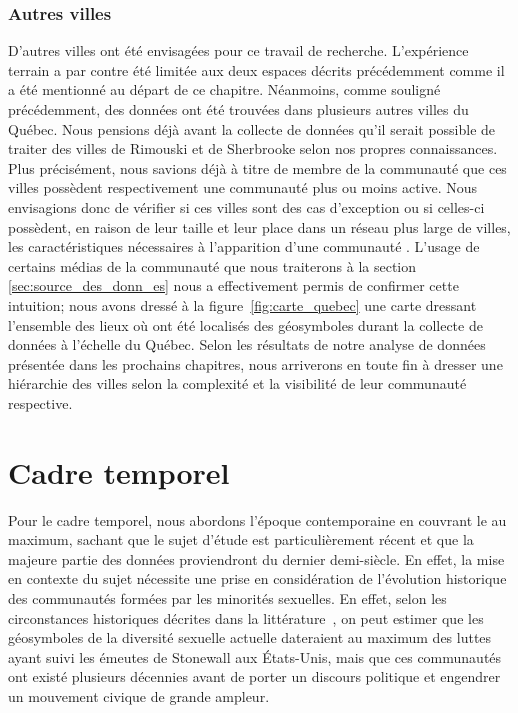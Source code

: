 \subsubsection{Autres villes}
\label{ssub:autres_villes}
D'autres villes ont été envisagées pour ce travail de recherche. 
L'expérience terrain a par contre été limitée aux deux espaces décrits précédemment comme il a été mentionné au départ de ce chapitre. 
Néanmoins, comme souligné précédemment, des données ont été trouvées dans plusieurs autres villes du Québec. 
Nous pensions déjà avant la collecte de données qu'il serait possible de traiter des villes de Rimouski et de Sherbrooke selon nos propres connaissances. 
Plus précisément, nous savions déjà à titre de membre de la communauté \lgbt{} que ces villes possèdent respectivement une communauté plus ou moins active. 
Nous envisagions donc de vérifier si ces villes sont des cas d'exception ou si celles-ci possèdent, en raison de leur taille et leur place dans un réseau plus large de villes, les caractéristiques nécessaires à l'apparition d'une communauté \lgbt.
L'usage de certains médias de la communauté que nous traiterons à la section \ref{sec:source_des_donn_es} nous a effectivement permis de confirmer cette intuition; nous avons dressé à la figure~\ref{fig:carte_quebec} une carte dressant l'ensemble des lieux où ont été localisés des géosymboles durant la collecte de données à l'échelle du Québec. 
Selon les résultats de notre analyse de données présentée dans les prochains chapitres, nous arriverons en toute fin à dresser une hiérarchie des villes selon la complexité et la visibilité de leur communauté respective.

\section{Cadre temporel}
\label{sec:cadre_temporel}
Pour le cadre temporel, nous abordons l'époque contemporaine en couvrant le  au maximum, sachant que le sujet d'étude est particulièrement récent et que la majeure partie des données proviendront du dernier demi-siècle. 
En effet, la mise en contexte du sujet nécessite une prise en considération de l'évolution historique des communautés formées par les minorités sexuelles. 
En effet, selon les circonstances historiques décrites dans la littérature~\citep{Spencer2005}, on peut estimer que les géosymboles de la diversité sexuelle actuelle dateraient au maximum des luttes ayant suivi les émeutes de Stonewall aux États-Unis, mais que ces communautés ont existé plusieurs décennies avant de porter un discours politique et engendrer un mouvement civique de grande ampleur.

